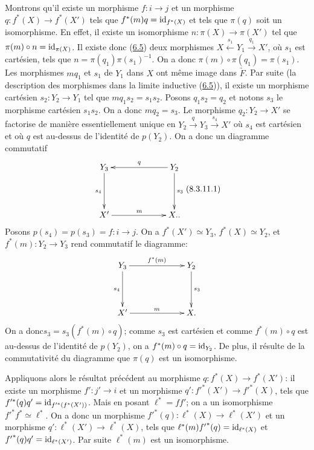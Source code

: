 \documentclass[10pt]{../fichiers-configuration-latex/smfart}
\begin{document}
Montrons qu'il existe un morphisme $f : i \to j$ et un morphisme $q
: f^{\ast} (X) \to f^{\ast}(X')$ tels que $f^{\ast}(m) q =
\operatorname{id}_{f^{\ast}(X)}$ et tels que $\pi(q)$ soit un isomorphisme. En
effet, il existe un isomorphisme $n : \pi (X) \to \pi (X')$ tel que
$\pi(m) \circ n = \operatorname{id}_{\pi(X)}$. Il existe donc (\hyperref[VI.prop6.5]{6.5})
deux morphismes $X \xleftarrow{s_1} Y_1 \xrightarrow{q_1} X'$,
où $s_1$ est cartésien, tels que $n = \pi(q_1) \pi(s_1)^{-1}$.
On a donc $\pi(m) \circ \pi(q_1) = \pi(s_1)$. Les morphismes $mq_1$
et $s_1$ de $Y_{1}$ dans $X$ ont même image dans
$\underrightarrow{F}$. Par suite (\cf la description des morphismes
dans la limite inductive (\hyperref[VI.prop6.5]{6.5})), il existe un morphisme
cartésien $s_2 : Y_2 \to Y_1$ tel que $mq_1s_2 = s_1 s_2$. Posons
$q_1 s_2 = q_2$ et notons $s_3$ le morphisme cartésien $s_1 s_2$. On
a donc $mq_2 = s_3$. Le morphisme $q_2 : Y_2 \to X'$ se factorise de
manière essentiellement unique en $Y_2 \xrightarrow{q} Y_3
\xrightarrow{s_4} X'$ où $s_4$ est cartésien et où $q$ est
au-dessus de l'identité de $p(Y_2)$. On a donc un diagramme
commutatif
\[\vcenter{
\xymatrix@C=2.25cm@R=1.5cm{
Y_3 \ar[d]_{s_4} & Y_2 \ar[l]_{q}\ar[d]^{s_3}\\
X'  \ar[r]^{m} & X.          .
}}\leqno{(8.3.11.1)}
\]
Posons $p(s_4) = p(s_3) = f : i \to j$. On a $f^{\ast} (X') \simeq
Y_3$, $f^{\ast} (X) \simeq Y_2$, et $f^{\ast}(m) : Y_2 \to Y_3$ rend
commutatif le diagramme:
\[
\xymatrix@C=2.25cm@R=1.5cm{
Y_3  \ar[r]^{f^{\ast}(m)} \ar[d]_{s_4} & Y_2 \ar[d]^{s_3}\\
X'  \ar[r]^{m} & X.
}
\]
On a donc\pageoriginale $s_3 = s_3 (f^{\ast}(m) \circ q)$; comme
$s_3$ est cartésien et comme $f^{\ast} (m) \circ q$ est au-dessus de
l'identité de $p(Y_2)$, on a $f^{\ast}(m) \circ q = \operatorname{id}_{Y_2}$. De
plus, il résulte de la commutativité du diagramme 
que $\pi (q)$ est un isomorphisme.

Appliquons alors le résultat précédent au morphisme $q : f^{\ast}
(X) \to f^{\ast}(X')$: il existe un morphisme $f' : j'\to i$ et un
morphisme $q': f'^{\ast}(X') \to f'^{\ast}(X)$, tels que
$f'^{\ast}(q) q'= \operatorname{id}_{f'^{\ast}(f^{\ast}(X'))}$. Mais en posant
$\ell^{\ast} = ff'$; on a un isomorphisme $f'^{\ast}f^{\ast} \simeq
\ell^{\ast}$. On a donc un morphisme $f'^{\ast}(q) : \ell^{\ast}(X)
\to \ell^{\ast}(X')$ et un morphisme $q':\ell^{\ast}(X')\to
\ell^{\ast}(X)$, tels que
$\ell^{\ast}(m){f'}^{\ast}(q)=\operatorname{id}_{\ell^{\ast}(X)}$ et
${f'}^{\ast}(q)q' = \operatorname{id}_{\ell^{\ast}(X')}$. Par suite
$\ell^{\ast}(m)$ est un isomorphisme.
\end{document}
